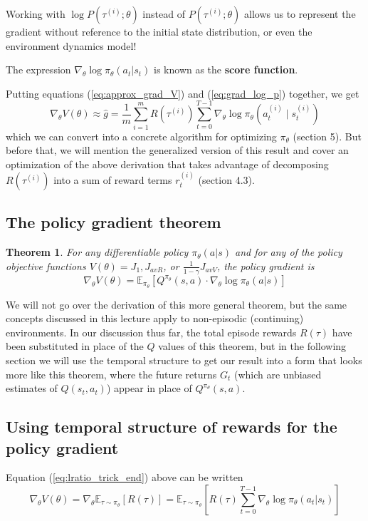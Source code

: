 \documentclass{article}
\newtheorem{theorem}{Theorem}[section]
\newcommand{\E}{\mathbb{E}}                                        %
\begin{document}
Working with $\log P(\tau^{(i)}; \theta)$ instead of $P(\tau^{(i)}; \theta)$ allows us to represent the gradient without reference to the initial state distribution, or even the environment dynamics model!

The expression $\nabla_\theta \log \pi_\theta(a_t | s_t)$ is known as the \textbf{score function}.

Putting equations (\ref{eq:approx_grad_V}) and (\ref{eq:grad_log_p}) together, we get
$$
\nabla_\theta V(\theta) \approx \hat{g}
= \frac{1}{m} \sum_{i=1}^m R(\tau^{(i)}) \sum_{t=0}^{T-1} \nabla_\theta \log \pi_\theta\left( a_t^{(i)} \mid s_t^{(i)} \right)
$$
which we can convert into a concrete algorithm for optimizing $\pi_\theta$ (section 5). But before that, we will mention the generalized version of this result and cover an optimization of the above derivation that takes advantage of decomposing $R(\tau^{(i)})$ into a sum of reward terms $r_t^{(i)}$ (section 4.3).

\subsection{The policy gradient theorem}
\begin{theorem}
For any differentiable policy $\pi_\theta(a|s)$ and for any of the policy objective functions $V(\theta) = J_1, J_{avR}$, or $\frac{1}{1-\gamma} J_{avV}$, the policy gradient is
\[ \nabla_\theta V(\theta) = \E_{\pi_\theta} [ Q^{\pi_\theta}(s,a) \cdot \nabla_\theta \log \pi_\theta(a|s) ] \]
\end{theorem}
We will not go over the derivation of this more general theorem, but the same concepts discussed in this lecture apply to non-episodic (continuing) environments. In our discussion thus far, the total episode rewards $R(\tau)$ have been substituted in place of the $Q$ values of this theorem, but in the following section we will use the temporal structure to get our result into a form that looks more like this theorem, where the future returns $G_t$ (which are unbiased estimates of $Q(s_t, a_t)$) appear in place of $Q^{\pi_\theta} (s,a)$.

\subsection{Using temporal structure of rewards for the policy gradient}
Equation (\ref{eq:lratio_trick_end}) above can be written
\begin{equation} \label{eq:policy_gradient}
\nabla_\theta V(\theta)
= \nabla_\theta \E_{\tau \sim \pi_\theta} [R(\tau)]
= \E_{\tau \sim \pi_\theta} \left[ R(\tau) \sum_{t=0}^{T-1} \nabla_\theta \log \pi_\theta(a_t | s_t) \right]
\end{equation}
\end{document}
